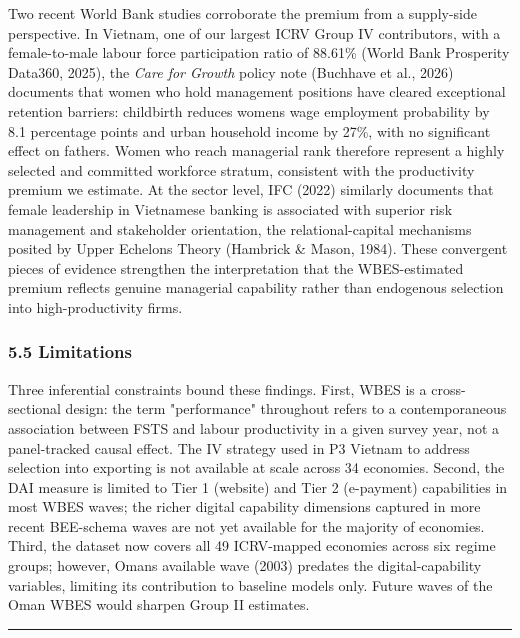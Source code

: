\documentclass[12pt,a4paper]{article}
\begin{document}
Two recent World Bank studies corroborate the premium from a supply-side
perspective. In Vietnam, one of our largest ICRV Group IV contributors,
with a female-to-male labour force participation ratio of 88.61\% (World
Bank Prosperity Data360, 2025), the \emph{Care for Growth} policy note
(Buchhave et al., 2026) documents that women who hold management
positions have cleared exceptional retention barriers: childbirth
reduces women\textquotesingle s wage employment probability by 8.1
percentage points and urban household income by 27\%, with no
significant effect on fathers. Women who reach managerial rank therefore
represent a highly selected and committed workforce stratum, consistent
with the productivity premium we estimate. At the sector level, IFC
(2022) similarly documents that female leadership in Vietnamese banking
is associated with superior risk management and stakeholder orientation,
the relational-capital mechanisms posited by Upper Echelons Theory
(Hambrick \& Mason, 1984). These convergent pieces of evidence
strengthen the interpretation that the WBES-estimated premium reflects
genuine managerial capability rather than endogenous selection into
high-productivity firms.

\hypertarget{55-limitations}{%
\subsubsection{5.5 Limitations}\label{55-limitations}}

Three inferential constraints bound these findings. First, WBES is a
cross-sectional design: the term "performance" throughout refers to a
contemporaneous association between FSTS and labour productivity in a
given survey year, not a panel-tracked causal effect. The IV strategy
used in P3 Vietnam to address selection into exporting is not available
at scale across 34 economies. Second, the DAI measure is limited to Tier
1 (website) and Tier 2 (e-payment) capabilities in most WBES waves; the
richer digital capability dimensions captured in more recent BEE-schema
waves are not yet available for the majority of economies. Third, the
dataset now covers all 49 ICRV-mapped economies across six regime
groups; however, Oman\textquotesingle s available wave (2003) predates
the digital-capability variables, limiting its contribution to baseline
models only. Future waves of the Oman WBES would sharpen Group II
estimates.

\begin{center}\rule{0.5\linewidth}{0.5pt}\end{center}
\end{document}
